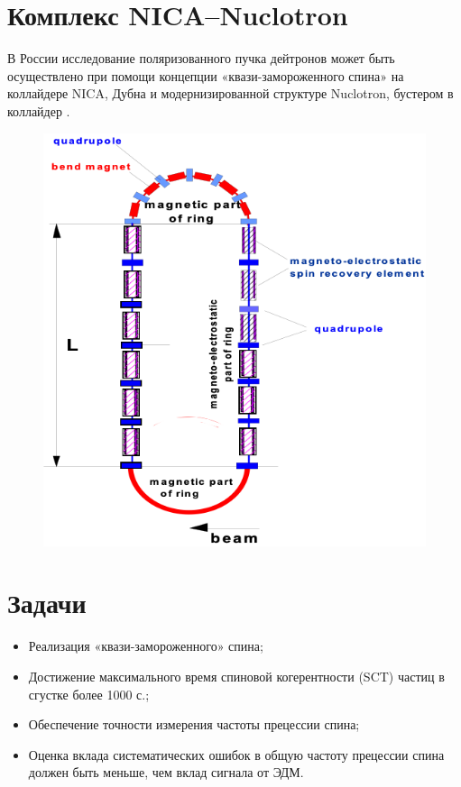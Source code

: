 \documentclass[final]{beamer}
\begin{document}
\begin{frame}[t]
\begin{multicols}{3}
\section{Комплекс NICA–Nuclotron}

В России исследование поляризованного пучка дейтронов может быть осуществлено при помощи концепции «квази-замороженного спина» на коллайдере NICA, Дубна \cite{ref6} и модернизированной структуре Nuclotron, бустером в коллайдер \cite{ref7}.

\begin{figure}[h]
            \centering
            \includegraphics[height=0.2\textheight]{QFS ring.png}
\end{figure}

\section{Задачи}

\begin{itemize}
    \item Реализация «квази-замороженного» спина;
    \item Достижение максимального время спиновой когерентности (SCT) частиц в сгустке более 1000 с.;
    \item Обеспечение точности измерения частоты прецессии спина;
    \item Оценка вклада систематических ошибок в общую частоту прецессии спина должен быть меньше, чем вклад сигнала от ЭДМ.
\end{itemize}



\end{multicols}
\end{frame}
\end{document}
